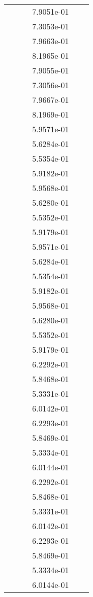 \begin{xltabular}{\textwidth}{r|rS[table-format=1.3e+2]S[table-format=1.4e+2]S[table-format=1.4e+2]S[table-format=-1.5]}
&  &  & 7.9051e-01 & & \\
&  &  & 7.3053e-01 & & \\
&  &  & 7.9663e-01 & & \\
&  &  & 8.1965e-01 & & \\
&  &  & 7.9055e-01 & & \\
&  &  & 7.3056e-01 & & \\
&  &  & 7.9667e-01 & & \\
&  &  & 8.1969e-01 & & \\
&  &  & 5.9571e-01 & & \\
&  &  & 5.6284e-01 & & \\
&  &  & 5.5354e-01 & & \\
&  &  & 5.9182e-01 & & \\
&  &  & 5.9568e-01 & & \\
&  &  & 5.6280e-01 & & \\
&  &  & 5.5352e-01 & & \\
&  &  & 5.9179e-01 & & \\
&  &  & 5.9571e-01 & & \\
&  &  & 5.6284e-01 & & \\
&  &  & 5.5354e-01 & & \\
&  &  & 5.9182e-01 & & \\
&  &  & 5.9568e-01 & & \\
&  &  & 5.6280e-01 & & \\
&  &  & 5.5352e-01 & & \\
&  &  & 5.9179e-01 & & \\
&  &  & 6.2292e-01 & & \\
&  &  & 5.8468e-01 & & \\
&  &  & 5.3331e-01 & & \\
&  &  & 6.0142e-01 & & \\
&  &  & 6.2293e-01 & & \\
&  &  & 5.8469e-01 & & \\
&  &  & 5.3334e-01 & & \\
&  &  & 6.0144e-01 & & \\
&  &  & 6.2292e-01 & & \\
&  &  & 5.8468e-01 & & \\
&  &  & 5.3331e-01 & & \\
&  &  & 6.0142e-01 & & \\
&  &  & 6.2293e-01 & & \\
&  &  & 5.8469e-01 & & \\
&  &  & 5.3334e-01 & & \\
&  &  & 6.0144e-01 & & \\

\end{xltabular}

